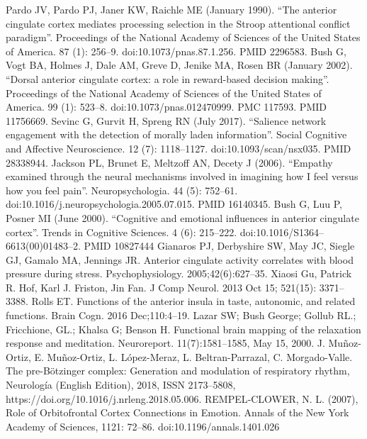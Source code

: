 \documentclass[twocolumn]{article}
\begin{document}
Pardo JV, Pardo PJ, Janer KW, Raichle ME (January 1990). “The anterior cingulate cortex mediates processing selection in the Stroop attentional conflict paradigm”. Proceedings of the National Academy of Sciences of the United States of America. 87 (1): 256–9. doi:10.1073/pnas.87.1.256. PMID 2296583.
Bush G, Vogt BA, Holmes J, Dale AM, Greve D, Jenike MA, Rosen BR (January 2002). “Dorsal anterior cingulate cortex: a role in reward-based decision making”. Proceedings of the National Academy of Sciences of the United States of America. 99 (1): 523–8. doi:10.1073/pnas.012470999. PMC 117593. PMID 11756669.
Sevinc G, Gurvit H, Spreng RN (July 2017). “Salience network engagement with the detection of morally laden information”. Social Cognitive and Affective Neuroscience. 12 (7): 1118–1127. doi:10.1093/scan/nsx035. PMID 28338944.
Jackson PL, Brunet E, Meltzoff AN, Decety J (2006). “Empathy examined through the neural mechanisms involved in imagining how I feel versus how you feel pain”. Neuropsychologia. 44 (5): 752–61. doi:10.1016/j.neuropsychologia.2005.07.015. PMID 16140345.
Bush G, Luu P, Posner MI (June 2000). “Cognitive and emotional influences in anterior cingulate cortex”. Trends in Cognitive Sciences. 4 (6): 215–222. doi:10.1016/S1364–6613(00)01483–2. PMID 10827444
Gianaros PJ, Derbyshire SW, May JC, Siegle GJ, Gamalo MA, Jennings JR. Anterior cingulate activity correlates with blood pressure during stress. Psychophysiology. 2005;42(6):627–35.
Xiaosi Gu, Patrick R. Hof, Karl J. Friston, Jin Fan. J Comp Neurol. 2013 Oct 15; 521(15): 3371–3388.
Rolls ET. Functions of the anterior insula in taste, autonomic, and related functions. Brain Cogn. 2016 Dec;110:4–19.
Lazar SW; Bush George; Gollub RL.; Fricchione, GL.; Khalsa G; Benson H. Functional brain mapping of the relaxation response and meditation.
Neuroreport. 11(7):1581–1585, May 15, 2000.
J. Muñoz-Ortiz, E. Muñoz-Ortiz, L. López-Meraz, L. Beltran-Parrazal, C. Morgado-Valle. The pre-Bötzinger complex: Generation and modulation of respiratory rhythm, Neurología (English Edition), 2018, ISSN 2173–5808,
https://doi.org/10.1016/j.nrleng.2018.05.006.
REMPEL‐CLOWER, N. L. (2007), Role of Orbitofrontal Cortex Connections in
Emotion. Annals of the New York Academy of Sciences, 1121:
72–86. doi:10.1196/annals.1401.026


\pagebreak
\end{document}
